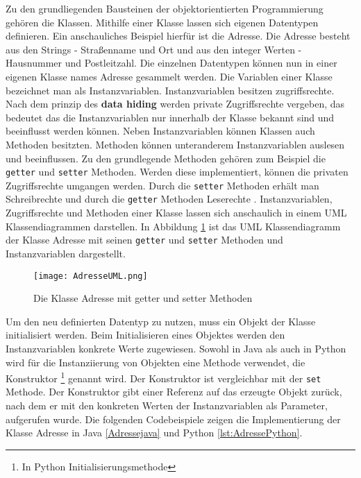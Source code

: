 Zu den grundliegenden Bausteinen der objektorientierten Programmierung gehören die Klassen. Mithilfe einer Klasse lassen sich eigenen Datentypen definieren. Ein anschauliches Beispiel hierfür ist die Adresse. Die Adresse besteht aus den Strings - Straßenname und Ort und aus den integer Werten - Hausnummer und Postleitzahl. Die einzelnen Datentypen können nun in einer eigenen Klasse names Adresse gesammelt werden. Die Variablen einer Klasse bezeichnet man als Instanzvariablen. 
Instanzvariablen besitzen zugriffsrechte. Nach dem prinzip des \textbf{data hiding} werden private Zugriffsrechte vergeben, das bedeutet das die Instanzvariablen nur innerhalb der Klasse bekannt sind und beeinflusst werden können.
Neben Instanzvariablen können Klassen auch Methoden besitzten. Methoden können unteranderem Instanzvariablen auslesen und beeinflussen. Zu den grundlegende Methoden gehören zum Beispiel die \texttt{getter} und \texttt{setter} Methoden. Werden diese implementiert, können die privaten Zugriffsrechte umgangen werden. Durch die \texttt{setter} Methoden erhält man Schreibrechte und durch die \texttt{getter} Methoden Leserechte \cite{JavaRatz}.
Instanzvariablen, Zugriffsrechte und Methoden einer Klasse lassen sich anschaulich in einem UML Klassendiagrammen darstellen. In Abbildung \ref{img:AdresseUML} ist das UML Klassendiagramm der Klasse Adresse mit seinen \texttt{getter} und \texttt{setter} Methoden und Instanzvariablen dargestellt. 

\begin{figure}[!htb]
    \centering
    \texttt{[image: AdresseUML.png]}
    \caption{Die Klasse Adresse mit getter und setter Methoden}
    \label{img:AdresseUML}
\end{figure}

Um den neu definierten Datentyp zu nutzen, muss ein Objekt der Klasse initialisiert werden. Beim Initialisieren eines Objektes werden den Instanzvariablen konkrete Werte zugewiesen. Sowohl in Java als auch in Python wird für die Instanziierung von Objekten eine Methode verwendet, die Konstruktor \footnote{In Python  Initialisierungsmethode} genannt wird. Der Konstruktor ist vergleichbar mit der \texttt{set} Methode. Der Konstruktor gibt einer Referenz auf das erzeugte Objekt zurück, nach dem er mit den konkreten Werten der Instanzvariablen als Parameter, aufgerufen wurde.  Die folgenden Codebeispiele zeigen die Implementierung der Klasse Adresse in Java \ref{Adressejava} und Python \ref{lst:AdressePython}.

